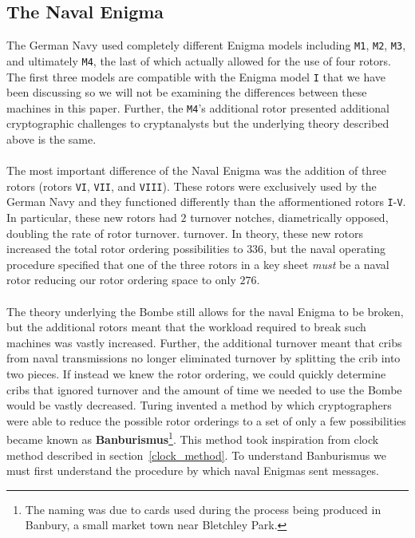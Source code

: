 \subsection{The Naval Enigma}
The German Navy used completely different Enigma models including
\texttt{M1}, \texttt{M2}, \texttt{M3}, and ultimately \texttt{M4},
the last of which actually allowed for the use of four rotors. The
first three models are compatible with the Enigma model \texttt{I}
that we have been discussing so we will not be examining the
differences between these machines in this paper. Further, the
\texttt{M4}'s additional rotor presented additional cryptographic
challenges to cryptanalysts but the underlying theory described above
is the same.
\\\\The most important difference of the Naval Enigma was the
addition of three rotors (rotors \texttt{VI}, \texttt{VII}, and
\texttt{VIII}). These rotors were exclusively used by the German Navy
and they functioned differently than the afformentioned rotors
\texttt{I}-\texttt{V}. In particular, these new rotors had $2$
turnover notches, diametrically opposed, doubling the rate of rotor turnover.
turnover. In theory, these new rotors increased the total rotor
ordering possibilities to $336$, but the naval operating procedure
specified that one of the three rotors in a key sheet \emph{must} be
a naval rotor reducing our rotor ordering space to only $276$.
\\\\The theory underlying the Bombe still allows for the naval Enigma
to be broken, but the additional rotors meant that the workload
required to break such machines was vastly increased. Further, the
additional turnover meant that cribs from naval transmissions no
longer eliminated turnover by splitting the crib into two pieces. If
instead we knew the rotor ordering, we could quickly determine cribs
that ignored turnover and the amount of time we needed to use the
Bombe would be vastly decreased. Turing invented a method by which
cryptographers
were able to reduce the possible rotor orderings to a set of only a
few possibilities became known as {\bf{Banburismus}}\footnote{The
  naming was due to cards used during the process being produced in
Banbury, a small market town near Bletchley Park.}. This method took
inspiration from clock method described in
section~\ref{clock_method}. To understand Banburismus we must first
understand the procedure by which naval Enigmas sent messages.
